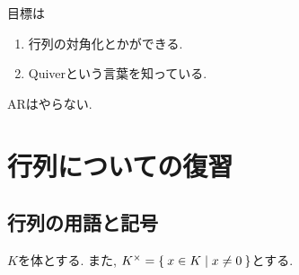 目標は
\begin{enumerate}
\item 行列の対角化とかができる.
\item Quiverという言葉を知っている.
\end{enumerate}
ARはやらない.

\tableofcontents
\chapter{行列についての復習}
\section{行列の用語と記号}
  

$K$を体とする.
また, $K^\times=\Set{x\in K|x\neq 0}$とする.

